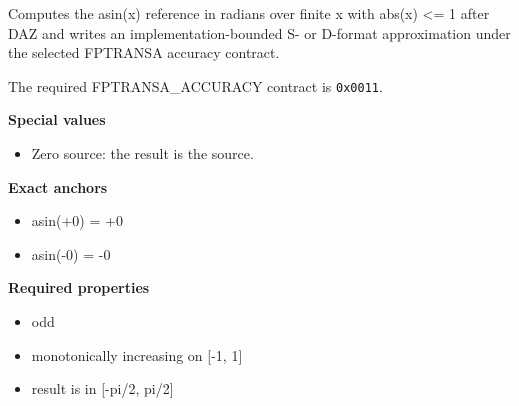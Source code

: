 Computes the asin(x) reference in radians over finite x with abs(x) \textless{}= 1 after DAZ and writes an implementation-bounded S- or D-format approximation under the selected FPTRANSA accuracy contract.

The required FPTRANSA\_ACCURACY contract is \texttt{0x0011}.

\textbf{Special values}\par
\begin{itemize}
\item Zero source: the result is the source.
\end{itemize}

\textbf{Exact anchors}\par
\begin{itemize}
\item asin(+0) = +0
\item asin(-0) = -0
\end{itemize}

\textbf{Required properties}\par
\begin{itemize}
\item odd
\item monotonically increasing on [-1, 1]
\item result is in [-pi/2, pi/2]
\end{itemize}
